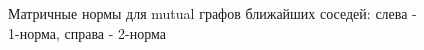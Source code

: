 
\begin{figure}[h]
  \begin{minipage}[h]{0.49\linewidth}
  \end{minipage}
  \hfill
  \begin{minipage}[h]{0.49\linewidth}
  \end{minipage}

  \caption{Матричные нормы для mutual графов ближайших соседей: слева - 1-норма, справа - 2-норма}
  \label{img:mut_graphs_norm}  
\end{figure}

